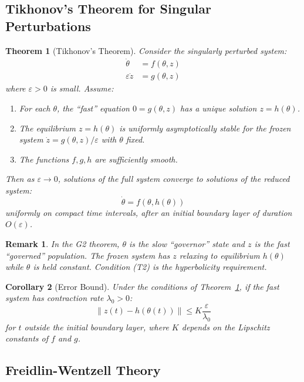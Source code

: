 \documentclass[12pt]{article}
\newtheorem{theorem}{Theorem}[section]
\newtheorem{corollary}[theorem]{Corollary}
\newtheorem{remark}{Remark}[section]
\begin{document}
\subsection{Tikhonov's Theorem for Singular Perturbations}

\begin{theorem}[Tikhonov's Theorem]
\label{thm:tikhonov}
Consider the singularly perturbed system:
\begin{align*}
\dot{\theta} &= f(\theta, z) \\
\varepsilon \dot{z} &= g(\theta, z)
\end{align*}
where $\varepsilon > 0$ is small. Assume:
\begin{enumerate}
    \item[(T1)] For each $\theta$, the ``fast'' equation $0 = g(\theta, z)$ has a unique solution $z = h(\theta)$.
    \item[(T2)] The equilibrium $z = h(\theta)$ is uniformly asymptotically stable for the frozen system $\dot{z} = g(\theta, z) / \varepsilon$ with $\theta$ fixed.
    \item[(T3)] The functions $f, g, h$ are sufficiently smooth.
\end{enumerate}
Then as $\varepsilon \to 0$, solutions of the full system converge to solutions of the reduced system:
\[
\dot{\theta} = f(\theta, h(\theta))
\]
uniformly on compact time intervals, after an initial boundary layer of duration $O(\varepsilon)$.
\end{theorem}

\begin{remark}
In the G2 theorem, $\theta$ is the slow ``governor'' state and $z$ is the fast ``governed'' population. The frozen system has $z$ relaxing to equilibrium $h(\theta)$ while $\theta$ is held constant. Condition (T2) is the hyperbolicity requirement.
\end{remark}

\begin{corollary}[Error Bound]
Under the conditions of Theorem~\ref{thm:tikhonov}, if the fast system has contraction rate $\lambda_0 > 0$:
\[
\|z(t) - h(\theta(t))\| \leq K \frac{\varepsilon}{\lambda_0}
\]
for $t$ outside the initial boundary layer, where $K$ depends on the Lipschitz constants of $f$ and $g$.
\end{corollary}

\subsection{Freidlin-Wentzell Theory}
\end{document}
